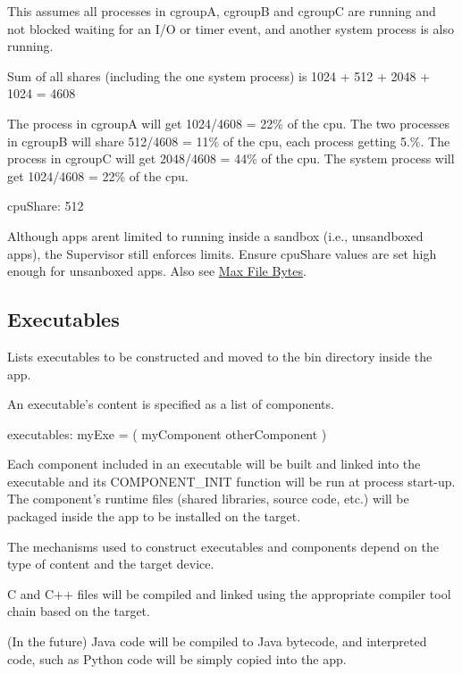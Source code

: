 This assumes all processes in cgroup\+A, cgroup\+B and cgroup\+C are running and not blocked waiting for an I/\+O or timer event, and another system process is also running.

Sum of all shares (including the one system process) is 1024 + 512 + 2048 + 1024 = 4608

The process in cgroup\+A will get 1024/4608 = 22\% of the cpu. The two processes in cgroup\+B will share 512/4608 = 11\% of the cpu, each process getting 5.\%. The process in cgroup\+C will get 2048/4608 = 44\% of the cpu. The system process will get 1024/4608 = 22\% of the cpu.

\begin{DoxyVerb}cpuShare: 512
\end{DoxyVerb}


Although apps aren\textquotesingle{}t limited to running inside a sandbox (i.\+e., unsandboxed apps), the Supervisor still enforces limits. Ensure {\ttfamily cpu\+Share} values are set high enough for unsanboxed apps. Also see \hyperlink{def_files_adef_defFilesAdef_processMaxFileBytes}{Max File Bytes}.\hypertarget{def_files_adef_defFilesAdef_executables}{}\subsection{Executables}\label{def_files_adef_defFilesAdef_executables}
Lists executables to be constructed and moved to the {\ttfamily bin} directory inside the app.

An executable’s content is specified as a list of components.

\begin{DoxyVerb}executables:
{
    myExe = ( myComponent otherComponent )
}
\end{DoxyVerb}


Each component included in an executable will be built and linked into the executable and its {\ttfamily C\+O\+M\+P\+O\+N\+E\+N\+T\+\_\+\+I\+N\+I\+T} function will be run at process start-\/up. The component’s runtime files (shared libraries, source code, etc.) will be packaged inside the app to be installed on the target.

The mechanisms used to construct executables and components depend on the type of content and the target device.

C and C++ files will be compiled and linked using the appropriate compiler tool chain based on the target.

(In the future) Java code will be compiled to Java bytecode, and interpreted code, such as Python code will be simply copied into the app.

